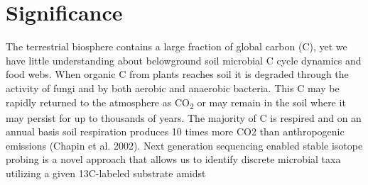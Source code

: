 \section{Significance} 
The terrestrial biosphere contains a large fraction of global carbon (C), yet we have little understanding about belowground soil microbial C cycle dynamics and food webs. When organic C from plants reaches soil it is degraded through the activity of fungi and by both aerobic and anaerobic bacteria. This C may be rapidly returned to the atmosphere as CO\textsubscript{2} or may remain in the soil where it may persist for up to thousands of years. The majority of C is respired and on an annual basis soil respiration produces 10 times more CO2 than anthropogenic emissions (Chapin et al. 2002). Next generation sequencing enabled stable isotope probing is a novel approach that allows us to identify discrete microbial taxa utilizing a given 13C-labeled substrate amidst  
 